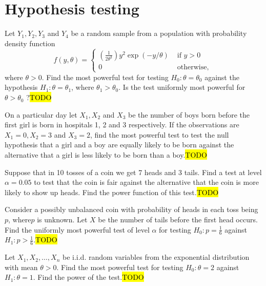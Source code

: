 
\chapter{Hypothesis testing\label{chap:hypothesisTesting}}
\begin{example}
\label{exa:isi2004samplepsb9}Let $Y_{1},Y_{2},Y_{3}$ and $Y_{4}$
be a random sample from a population with probability density function
\[
f(y,\theta)=\begin{cases}
\left(\frac{1}{2\theta^{3}}\right)y^{2}\exp(-y/\theta) & \text{ if }y>0\\
0 & \text{ otherwise, }
\end{cases}
\]
 where $\theta>0$. Find the most powerful test for testing $H_{0}:\theta=\theta_{0}$
against the hypothesis $H_{1}:\theta=\theta_{1}$, where $\theta_{1}>\theta_{0}$.
Is the test uniformly most powerful for $\theta>\theta_{0}$ ?\hl{TODO}
\end{example}

\begin{example}
\label{exa:isi2004samplepsb10}On a particular day let $X_{1},X_{2}$
and $X_{3}$ be the number of boys born before the first girl is born
in hospitals 1, 2 and 3 respectively. If the observations are $X_{1}=0,X_{2}=3$
and $X_{3}=2$, find the most powerful test to test the null hypothesis
that a girl and a boy are equally likely to be born against the alternative
that a girl is less likely to be born than a boy.\hl{TODO}
\end{example}

\begin{example}
\label{exa:isi2005samplepsb10}Suppose that in 10 tosses of a coin
we get 7 heads and 3 tails. Find a test at level $\alpha=0.05$ to
test that the coin is fair against the alternative that the coin is
more likely to show up heads. Find the power function of this test.\hl{TODO}
\end{example}

\begin{example}
\label{exa:isi2006samplepsb12}Consider a possibly unbalanced coin
with probability of heads in each toss being $p$, where$p$ is unknown.
Let $X$ be the number of tails before the first head occurs. Find
the uniformly most powerful test of level $\alpha$ for testing $H_{0}:p=\frac{1}{6}$
against $H_{1}:p>\frac{1}{6}$.\hl{TODO}
\end{example}

\begin{example}
\label{exa:isi2007samplepsb11}Let $X_{1},X_{2},\ldots,X_{n}$ be
i.i.d. random variables from the exponential distribution with mean
$\theta>0$. Find the most powerful test for testing $H_{0}:\theta=2$
against $H_{1}:\theta=1$. Find the power of the test.\hl{TODO}
\end{example}

